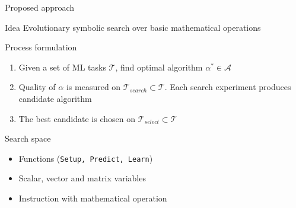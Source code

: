 \documentclass{beamer}
\begin{document}
\begin{frame}{Proposed approach}
    \begin{block}{Idea}
        Evolutionary symbolic search over basic mathematical operations
    \end{block}

    \begin{block}{Process formulation}
    \begin{enumerate}
        \item Given a set of ML tasks $\mathcal{T}$, find optimal algorithm $\alpha^* \in \mathcal{A}$
        \item Quality of $\alpha$ is measured on $\mathcal{T}_{search} \subset \mathcal{T}$. Each search experiment produces candidate algorithm
        \item The best candidate is chosen on $\mathcal{T}_{select} \subset \mathcal{T}$
    \end{enumerate}
        
    \end{block}

    \begin{block}{Search space}
        \begin{itemize}
            \item Functions (\texttt{Setup, Predict, Learn})
            \item Scalar, vector and matrix variables
            \item Instruction with mathematical operation
        \end{itemize}
    \end{block}

\end{frame}
\end{document}
